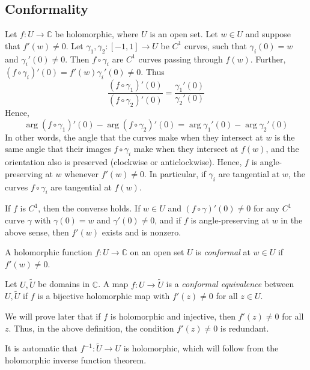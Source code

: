 \subsection{Conformality}
Let \( f \colon U \to \mathbb C \) be holomorphic, where \( U \) is an open set.
Let \( w \in U \) and suppose that \( f'(w) \neq 0 \).
Let \( \gamma_1, \gamma_2 \colon [-1, 1] \to U \) be \( C^1 \) curves, such that \( \gamma_i(0) = w \) and \( \gamma_i'(0) \neq 0 \).
Then \( f \circ \gamma_i \) are \( C^1 \) curves passing through \( f(w) \).
Further, \( (f \circ \gamma_i)'(0) = f'(w) \gamma_i'(0) \neq 0 \).
Thus
\[
	\frac{(f \circ \gamma_1)'(0)}{(f \circ \gamma_2)'(0)} = \frac{\gamma_1'(0)}{\gamma_2'(0)}
\]
Hence,
\[
	\arg(f \circ \gamma_1)'(0) - \arg(f \circ \gamma_2)'(0) = \arg \gamma_1'(0) - \arg \gamma_2'(0)
\]
In other words, the angle that the curves make when they intersect at \( w \) is the same angle that their images \( f \circ \gamma_i \) make when they intersect at \( f(w) \), and the orientation also is preserved (clockwise or anticlockwise).
Hence, \( f \) is angle-preserving at \( w \) whenever \( f'(w) \neq 0 \).
In particular, if \( \gamma_i \) are tangential at \( w \), the curves \( f \circ \gamma_i \) are tangential at \( f(w) \).
\begin{remark}
	If \( f \) is \( C^1 \), then the converse holds.
	If \( w \in U \) and \( (f \circ \gamma)'(0) \neq 0 \) for any \( C^1 \) curve \( \gamma \) with \( \gamma(0) = w \) and \( \gamma'(0) \neq 0 \), and if \( f \) is angle-preserving at \( w \) in the above sense, then \( f'(w) \) exists and is nonzero.
\end{remark}
\begin{definition}
	A holomorphic function \( f \colon U \to \mathbb C \) on an open set \( U \) is \textit{conformal} at \( w \in U \) if \( f'(w) \neq 0 \).
\end{definition}
\begin{definition}
	Let \( U, \widetilde U \) be domains in \( \mathbb C \).
	A map \( f \colon U \to \widetilde U \) is a \textit{conformal equivalence} between \( U, \widetilde U \) if \( f \) is a bijective holomorphic map with \( f'(z) \neq 0 \) for all \( z \in U \).
\end{definition}
\begin{remark}
	We will prove later that if \( f \) is holomorphic and injective, then \( f'(z) \neq 0 \) for all \( z \).
	Thus, in the above definition, the condition \( f'(z) \neq 0 \) is redundant.
\end{remark}
\begin{remark}
	It is automatic that \( f^{-1} \colon \widetilde U \to U \) is holomorphic, which will follow from the holomorphic inverse function theorem.
\end{remark}
